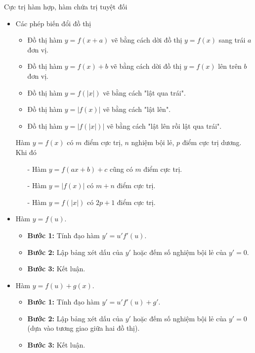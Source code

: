 \begin{dang}{Cực trị hàm hợp, hàm chứa trị tuyệt đối}
    \begin{itemize}
        \item Các phép biến đổi đồ thị
        \begin{itemize}
            \item Đồ thị hàm $y=f(x+a)$ vẽ bằng cách dời đồ thị $y=f(x)$ sang trái $a$ đơn vị.
            \item Đồ thị hàm $y=f(x)+b$ vẽ bằng cách dời đồ thị $y=f(x)$ lên trên $b$ đơn vị.
            \item Đồ thị hàm $y=f(|x|)$ vẽ bằng cách "lật qua trái".
            \item Đồ thị hàm $y=|f(x)|$ vẽ bằng cách "lật lên".
            \item Đồ thị hàm $y=|f(|x|)|$ vẽ bằng cách "lật lên rồi lật qua trái".
        \end{itemize}
        \begin{note} Hàm $y=f(x)$ có $m$ điểm cực trị, $n$ nghiệm bội lẻ, $p$ điểm cực trị dương. Khi đó
            \begin{itemize}
                \item[-]Hàm $y=f(ax+b)+c$ cũng có $m$ điểm cực trị.
                \item[-]	Hàm $y=|f(x)|$ có $m+n$  điểm cực trị.
                \item[-] 	Hàm $y=f(|x|)$ có $2p+1$  điểm cực trị.
            \end{itemize}
        \end{note}
        \item Hàm $y=f(u)$.
        \begin{itemize}
            \item \textbf{Bước 1: } Tính đạo hàm $y'=u'f'(u)$.
            \item \textbf{Bước 2: } Lập bảng xét dấu của $y'$ hoặc đếm số nghiệm bội lẻ của $y'=0$.
            \item \textbf{Bước 3: } Kết luận.
        \end{itemize}
        \item Hàm $y=f(u)+g(x)$.
        \begin{itemize}
            \item \textbf{Bước 1: } Tính đạo hàm $y'=u'f'(u)+g'$.
            \item \textbf{Bước 2: } Lập bảng xét dấu của $y'$ hoặc đếm số nghiệm bội lẻ của $y'=0$ (dựa vào tương giao giữa hai đồ thị).
            \item \textbf{Bước 3: } Kết luận.
        \end{itemize}
    \end{itemize}
\end{dang}
